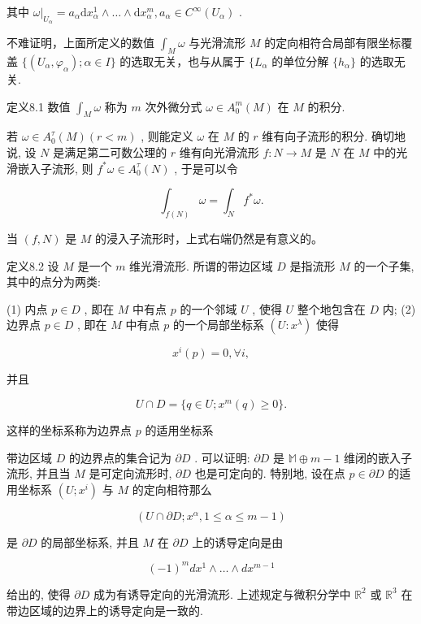 其中  $\omega|_{U_\alpha} = a_\alpha \mathrm{d}x_\alpha^1 \wedge \dots \wedge \mathrm{d}x_\alpha^m, a_\alpha \in C^\infty(U_\alpha)$ .

不难证明，上面所定义的数值  $\int_{M}\omega$  与光滑流形  $M$  的定向相符合局部有限坐标覆盖  $\{(U_{\alpha},\varphi_{\alpha});\alpha \in I\}$  的选取无关，也与从属于  $\{L_{\alpha}$  的单位分解  $\{h_\alpha \}$  的选取无关.

定义8.1 数值  $\int_{M} \omega$  称为  $m$  次外微分式  $\omega \in A_0^m(M)$  在  $M$  的积分.

若  $\omega \in A_0^\tau (M)(r < m)$ , 则能定义  $\omega$  在  $M$  的  $r$  维有向子流形的积分. 确切地说, 设  $N$  是满足第二可数公理的  $r$  维有向光滑流形  $f: N \to M$  是  $N$  在  $M$  中的光滑嵌入子流形, 则  $f^*\omega \in A_0^\tau (N)$ , 于是可以令

$$
\int_ {f (N)} \omega = \int_ {N} f ^ {*} \omega . %
$$

当  $(f, N)$  是  $M$  的浸入子流形时，上式右端仍然是有意义的。

定义8.2 设  $M$  是一个  $m$  维光滑流形. 所谓的带边区域  $D$  是指流形  $M$  的一个子集, 其中的点分为两类:

(1) 内点  $p \in D$ , 即在  $M$  中有点  $p$  的一个邻域  $U$ , 使得  $U$  整个地包含在  $D$  内;  
(2) 边界点  $p \in D$ , 即在  $M$  中有点  $p$  的一个局部坐标系  $(U: x^{\lambda})$  使得

$$
x ^ {i} (p) = 0, \forall i,
$$

并且

$$
U \cap D = \{q \in U; x ^ {m} (q) \geqslant 0 \}. %
$$

这样的坐标系称为边界点  $p$  的适用坐标系

带边区域  $D$  的边界点的集合记为  $\partial D$ . 可以证明:  $\partial D$  是  $\mathbb{M} \oplus m - 1$  维闭的嵌入子流形, 并且当  $M$  是可定向流形时,  $\partial D$  也是可定向的. 特别地, 设在点  $p \in \partial D$  的适用坐标系  $(U; x^i)$  与  $M$  的定向相符那么

$$
\left(U \cap \partial D; x ^ {\alpha}, 1 \leqslant \alpha \leqslant m - 1\right)
$$

是  $\partial D$  的局部坐标系, 并且  $M$  在  $\partial D$  上的诱导定向是由

$$
(- 1) ^ {m} d x ^ {1} \wedge \dots \wedge d x ^ {m - 1} %
$$

给出的, 使得  $\partial D$  成为有诱导定向的光滑流形. 上述规定与微积分学中  $\mathbb{R}^2$  或  $\mathbb{R}^3$  在带边区域的边界上的诱导定向是一致的.

